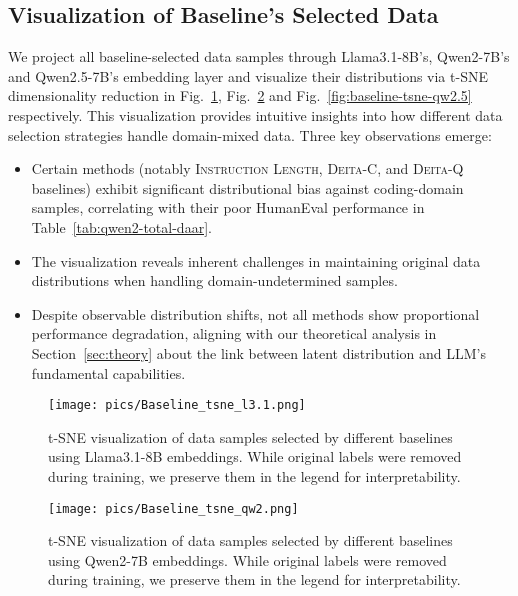 \subsection{Visualization of Baseline's Selected Data}
\label{sec:appendix-baseline-tsne}

We project all baseline-selected data samples through Llama3.1-8B's, Qwen2-7B's and Qwen2.5-7B's embedding layer and visualize their distributions via t-SNE dimensionality reduction in Fig.~\ref{fig:baseline-tsne-l3.1}, Fig.~\ref{fig:baseline-tsne-qw2} and Fig.~\ref{fig:baseline-tsne-qw2.5} respectively. This visualization provides intuitive insights into how different data selection strategies handle domain-mixed data. Three key observations emerge: 

\begin{itemize}
    \item[1] Certain methods (notably \textsc{Instruction Length}, \textsc{Deita-C}, and \textsc{Deita-Q} baselines) exhibit significant distributional bias against coding-domain samples, correlating with their poor HumanEval performance in Table~\ref{tab:qwen2-total-daar}.
    \item[2] The visualization reveals inherent challenges in maintaining original data distributions when handling domain-undetermined samples.
    \item[3]  Despite observable distribution shifts, not all methods show proportional performance degradation, aligning with our theoretical analysis in Section~\ref{sec:theory} about the link between latent distribution and LLM's fundamental capabilities.
\end{itemize}

\begin{figure}[h]
\centering
\texttt{[image: pics/Baseline\_tsne\_l3.1.png]}
\vspace{-0.4cm}
\caption{t-SNE visualization of data samples selected by different baselines using Llama3.1-8B embeddings. While original labels were removed during training, we preserve them in the legend for interpretability.}
\label{fig:baseline-tsne-l3.1}
\end{figure}

\begin{figure}[h]
\centering
\texttt{[image: pics/Baseline\_tsne\_qw2.png]}
\vspace{-0.4cm}
\caption{t-SNE visualization of data samples selected by different baselines using Qwen2-7B embeddings. While original labels were removed during training, we preserve them in the legend for interpretability.}
\label{fig:baseline-tsne-qw2}
\end{figure}

